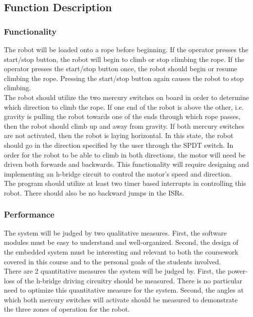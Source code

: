 \documentclass{article}
\begin{document}
	\subsection{Function Description}

		\subsubsection{Functionality}
			The robot will be loaded onto a rope before beginning. If the operator presses the start/stop button, the robot will begin to climb or stop climbing the rope. If the operator presses the start/stop button once, the robot should begin or resume climbing the rope. Pressing the start/stop button again causes the robot to stop climbing.\\
		The robot should utilize the two mercury switches on board in order to determine which direction to climb the rope. If one end of the robot is above the other, i.e. gravity is pulling the robot towards one of the ends through which rope passes, then the robot should climb up and away from gravity. If both mercury switches are not activated, then the robot is laying horizontal. In this state, the robot should go in the direction specified by the user through the SPDT switch. In order for the robot to be able to climb in both directions, the motor will need be driven both forwards and backwards. This functionality will require designing and implementing an h-bridge circuit to control the motor's speed and direction.\\
		The program should utilize at least two timer based interrupts in controlling this robot. There should also be no backward jumps in the ISRs.
	
		\subsubsection{Performance}
			The system will be judged by two qualitative measures. First, the software modules must be easy to understand and well-organized. Second, the design of the embedded system must be interesting and relevant to both the coursework covered in this course and to the personal goals of the students involved.\\
		There are 2 quantitative measures the system will be judged by. First, the power-loss of the h-bridge driving circuitry should be measured. There is no particular need to optimize this quantitative measure for the system. Second, the angles at which both mercury switches will activate should be measured to demonstrate the three zones of operation for the robot.
	
\end{document}
